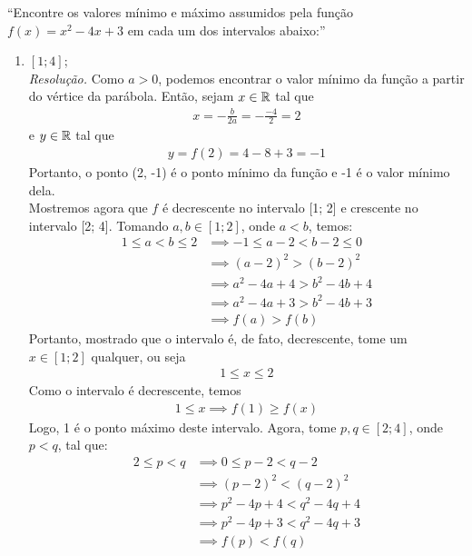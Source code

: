 \enquote{Encontre os valores mínimo e máximo assumidos pela função $f(x) = x^2 - 4x + 3$ em cada um dos intervalos abaixo:}
\begin{enumerate}
    \item $[1; 4]$; \\
    \emph{Resolução.} Como $a > 0$, podemos encontrar o valor mínimo da função a partir do vértice da parábola. Então, sejam $x \in \mathbb R$ tal que
    \begin{align*}
        x = -\frac{b}{2a} = -\frac{-4}{2} = 2
    \end{align*}
    e $y \in \mathbb R$ tal que 
    \begin{align*}
        y = f(2) = 4 - 8 + 3 = -1
    \end{align*}
    Portanto, o ponto (2, -1) é o ponto mínimo da função e -1 é o valor mínimo dela. \\
    Mostremos agora que $f$ é decrescente no intervalo [1; 2] e crescente no intervalo [2; 4]. Tomando $a, b \in [1; 2]$, onde $a < b$, temos:
    \begin{align*}
        1 \le a < b \le 2 & \implies -1 \le a - 2 < b - 2 \le 0 \\ & \implies
        (a - 2)^2 > (b - 2)^2 \\ & \implies
        a^2 - 4a + 4 > b^2 - 4b + 4 \\ & \implies
        a^2 - 4a + 3 > b^2 - 4b + 3 \\ & \implies
        f(a) > f(b)
    \end{align*}
    Portanto, mostrado que o intervalo é, de fato, decrescente, tome um $x \in [1; 2]$ qualquer, ou seja
    \begin{align*}
        1 \le x \le 2
    \end{align*}
    Como o intervalo é decrescente, temos
    \begin{align*}
        1 \le x \implies f(1) \ge f(x)
    \end{align*}
    Logo, 1 é o ponto máximo deste intervalo. Agora, tome $p, q \in [2;4]$, onde $p < q$, tal que:
    \begin{align*}
        2 \le p < q & \implies 0 \le p - 2 < q - 2 \\ & \implies
        (p - 2)^2 < (q - 2)^2 \\ & \implies
        p^2 - 4p + 4 < q^2 - 4q + 4 \\ & \implies
        p^2 - 4p + 3 < q^2 - 4q + 3 \\ & \implies 
        f(p) < f(q)
    \end{align*}

\end{enumerate}
